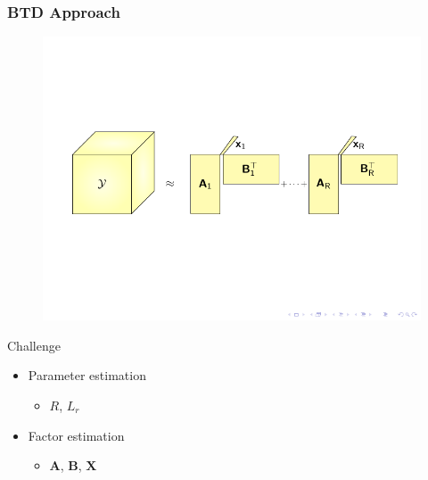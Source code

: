 \documentclass{beamer}
\begin{document}
	\begin{frame}
		\frametitle{BTD Approach}
		
		\vspace{-0.7cm}
		\begin{figure}[htb]
			\centering
			\includegraphics[scale=1.0,clip=true,trim={0.8cm 6.5cm 0.6cm 6.2cm}]{tikz_BTDY.pdf}
		\end{figure}
		\vspace{2.8cm}
		\begin{block}{Challenge}			
				\begin{itemize}
					\item Parameter estimation
					\begin{itemize}
						\item $R$, $L_{r}$
					\end{itemize}
					\item Factor estimation
					\begin{itemize}
						\item $\textbf{A}$, $\textbf{B}$, $\textbf{X}$
					\end{itemize}
				\end{itemize}
		\end{block}
	\end{frame}
\end{document}
